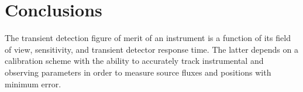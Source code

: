 \documentclass{aa}
\begin{document}




\section{Conclusions}

The transient  detection figure of merit of  an instrument is a  function of its
field of  view, sensitivity,  and transient detector  response time.  The latter
depends  on  a   calibration  scheme  with  the  ability   to  accurately  track
instrumental  and observing  parameters in  order to  measure source  fluxes and
positions with minimum error.
\end{document}
